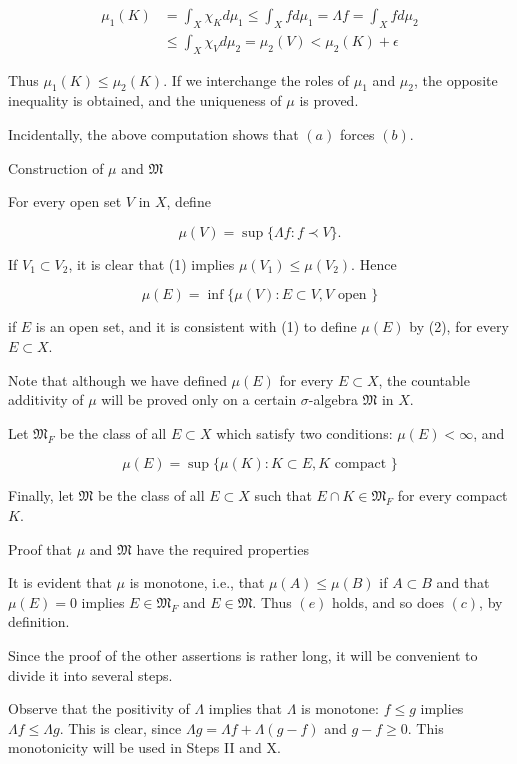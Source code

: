 \documentclass[10pt]{article}
\begin{document}
$$
\begin{aligned}
\mu_{1}(K) & =\int_{X} \chi_{K} d \mu_{1} \leq \int_{X} f d \mu_{1}=\Lambda f=\int_{X} f d \mu_{2} \\
& \leq \int_{X} \chi_{V} d \mu_{2}=\mu_{2}(V)<\mu_{2}(K)+\epsilon
\end{aligned}
$$

Thus $\mu_{1}(K) \leq \mu_{2}(K)$. If we interchange the roles of $\mu_{1}$ and $\mu_{2}$, the opposite inequality is obtained, and the uniqueness of $\mu$ is proved.

Incidentally, the above computation shows that $(a)$ forces $(b)$.

Construction of $\mu$ and $\mathfrak{M}$

For every open set $V$ in $X$, define

$$
\mu(V)=\sup \{\Lambda f: f \prec V\} .
$$

If $V_{1} \subset V_{2}$, it is clear that (1) implies $\mu\left(V_{1}\right) \leq \mu\left(V_{2}\right)$. Hence

$$
\mu(E)=\inf \{\mu(V): E \subset V, V \text { open }\}
$$

if $E$ is an open set, and it is consistent with (1) to define $\mu(E)$ by (2), for every $E \subset X$.

Note that although we have defined $\mu(E)$ for every $E \subset X$, the countable additivity of $\mu$ will be proved only on a certain $\sigma$-algebra $\mathfrak{M}$ in $X$.

Let $\mathfrak{M}_{F}$ be the class of all $E \subset X$ which satisfy two conditions: $\mu(E)<\infty$, and

$$
\mu(E)=\sup \{\mu(K): K \subset E, K \text { compact }\}
$$

Finally, let $\mathfrak{M}$ be the class of all $E \subset X$ such that $E \cap K \in \mathfrak{M}_{F}$ for every compact $K$.

Proof that $\mu$ and $\mathfrak{M}$ have the required properties

It is evident that $\mu$ is monotone, i.e., that $\mu(A) \leq \mu(B)$ if $A \subset B$ and that $\mu(E)=0$ implies $E \in \mathfrak{M}_{F}$ and $E \in \mathfrak{M}$. Thus $(e)$ holds, and so does $(c)$, by definition.

Since the proof of the other assertions is rather long, it will be convenient to divide it into several steps.

Observe that the positivity of $\Lambda$ implies that $\Lambda$ is monotone: $f \leq g$ implies $\Lambda f \leq \Lambda g$. This is clear, since $\Lambda g=\Lambda f+\Lambda(g-f)$ and $g-f \geq 0$. This monotonicity will be used in Steps II and X.
\end{document}
